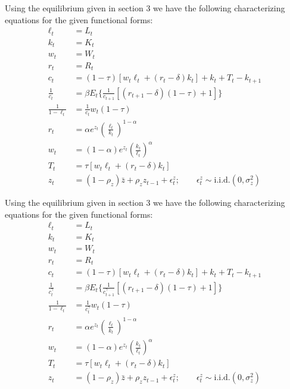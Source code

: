 \documentclass[letterpaper,11pt]{article}
\theoremstyle{definition}
\begin{document}
\begin{spacing}{1.5}
	\begin{Exercise} \label{DSGE_HW_CharEq_Ln}
		Using the equilibrium given in section 3 we have the following characterizing equations for the given functional forms:
		\begin{align*}
			\ell_t &= L_t \\
			k_t &= K_t \\
			w_t &= W_t \\
			r_t &= R_t \\
			c_t &= (1-\tau)[w_t\ell_t+(r_t-\delta)k_t]+k_t+T_t-k_{t+1} \\
			\frac{1}{c_t} &=  \beta E_t\{\frac{1}{c_{t+1}}[(r_{t+1}-\delta)(1-\tau)+1]\} \\
			\frac{1}{1-\ell_t} &= \frac{1}{c_t}w_t(1-\tau) \\
			r_t&= \alpha e^{z_t}(\frac{\ell_t}{k_t})^{1-\alpha}\\
			w_t&= (1-\alpha) e^{z_t}(\frac{k_t}{\ell_t})^{\alpha}\\
			T_t &= \tau[w_t\ell_t+(r_t-\delta)k_t] \\
			z_t &= (1-\rho_z)\bar{z}+\rho_zz_{t-1}+\epsilon_t^z; \qquad \epsilon_t^z \sim \text{i.i.d.}(0,\sigma_z^2)
		\end{align*}
	\end{Exercise}

	\begin{Exercise} \label{DSGE_HW_CharEq_CES_Ln}
		Using the equilibrium given in section 3 we have the following characterizing equations for the given functional forms:
		\begin{align*}
			\ell_t &= L_t \\
			k_t &= K_t \\
			w_t &= W_t \\
			r_t &= R_t \\
			c_t &= (1-\tau)[w_t\ell_t+(r_t-\delta)k_t]+k_t+T_t-k_{t+1} \\
			\frac{1}{c_t^\gamma} &=  \beta E_t \{\frac{1}{c_{t+1}^\gamma}[(r_{t+1}-\delta)(1-\tau)+1]\} \\
			\frac{1}{1-\ell_t} &= \frac{1}{c_t^\gamma}w_t(1-\tau) \\
			r_t&= \alpha e^{z_t}(\frac{\ell_t}{k_t})^{1-\alpha}\\
			w_t&= (1-\alpha) e^{z_t}(\frac{k_t}{\ell_t})^{\alpha}\\
			T_t &= \tau[w_t\ell_t+(r_t-\delta)k_t] \\
			z_t &= (1-\rho_z)\bar{z}+\rho_zz_{t-1}+\epsilon_t^z; \qquad \epsilon_t^z \sim \text{i.i.d.}(0,\sigma_z^2)
		\end{align*}
	\end{Exercise}


\end{spacing}
\end{document}
